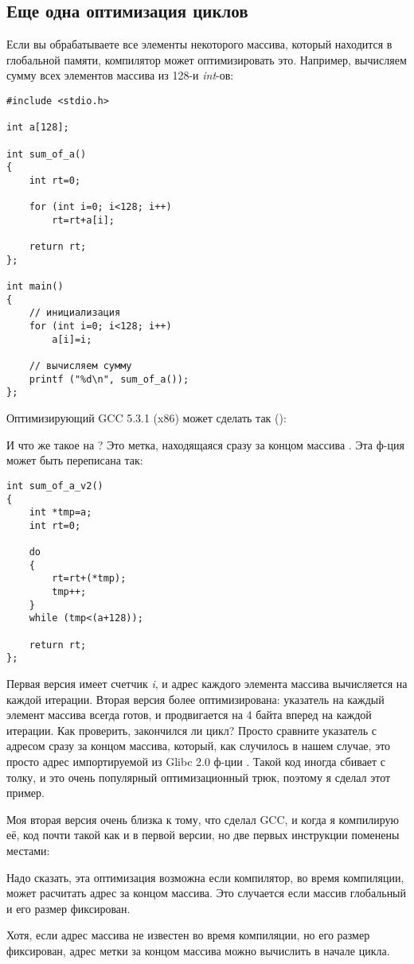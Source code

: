 \subsection{Еще одна оптимизация циклов}

Если вы обрабатываете все элементы некоторого массива, который находится в глобальной памяти, компилятор может оптимизировать
это.
Например, вычисляем сумму всех элементов массива из 128-и \emph{int}-ов:

\begin{lstlisting}[style=customc]
#include <stdio.h>

int a[128];

int sum_of_a()
{
	int rt=0;
	
	for (int i=0; i<128; i++)
		rt=rt+a[i];

	return rt;
};

int main()
{
	// инициализация
	for (int i=0; i<128; i++)
		a[i]=i;
	
	// вычисляем сумму
	printf ("%d\n", sum_of_a());
};
\end{lstlisting}

Оптимизирующий GCC 5.3.1 (x86) может сделать так (\IDA):



И что же такое  на ?
Это метка, находящаяся сразу за концом массива .
Эта ф-ция может быть переписана так:

\begin{lstlisting}[style=customc]
int sum_of_a_v2()
{
	int *tmp=a;
	int rt=0;
	
	do
	{
		rt=rt+(*tmp);
		tmp++;
	}
	while (tmp<(a+128));

	return rt;
};
\end{lstlisting}

Первая версия имеет счетчик \emph{i}, и адрес каждого элемента массива вычисляется на каждой итерации.
Вторая версия более оптимизирована: указатель на каждый элемент массива всегда готов, и продвигается на 4 байта вперед
на каждой итерации.
Как проверить, закончился ли цикл?
Просто сравните указатель с адресом сразу за концом массива, который, как случилось в нашем случае, это просто адрес
импортируемой из Glibc 2.0 ф-ции .
Такой код иногда сбивает с толку, и это очень популярный оптимизационный трюк, поэтому я сделал этот пример.

Моя вторая версия очень близка к тому, что сделал GCC, и когда я компилирую её, код почти такой как и в первой версии,
но две первых инструкции поменены местами:



Надо сказать, эта оптимизация возможна если компилятор, во время компиляции, может расчитать адрес за концом массива.
Это случается если массив глобальный и его размер фиксирован.

Хотя, если адрес массива не известен во время компиляции, но его размер фиксирован, адрес метки за концом массива
можно вычислить в начале цикла.


